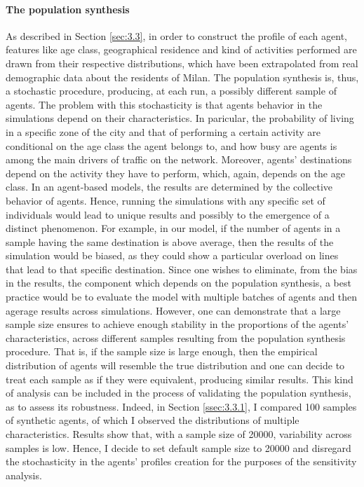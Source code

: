 \paragraph{The population synthesis} 
As described in Section \ref{sec:3.3}, in order to construct the profile of each agent, features like age class, geographical residence and kind of activities performed are drawn from their respective distributions, which have been extrapolated from real demographic data about the residents of Milan. The population synthesis is, thus, a stochastic procedure, producing, at each run, a possibly different sample of agents. The problem with this stochasticity is that agents behavior in the simulations depend on their characteristics. In paricular, the probability of living in a specific zone of the city and that of performing a certain activity are conditional on the age class the agent belongs to, and how busy are agents is among the main drivers of traffic on the network. Moreover, agents' destinations depend on the activity they have to perform, which, again, depends on the age class. In an agent-based models, the results are determined by the collective behavior of agents. Hence, running the simulations with any specific set of individuals would lead to unique results and possibly to the emergence of a distinct phenomenon. For example, in our model, if the number of agents in a sample having the same destination is above average, then the results of the simulation would be biased, as they could show a particular overload on lines that lead to that specific destination. Since one wishes to eliminate, from the bias in the results, the component which depends on the population synthesis, a best practice would be to evaluate the model with multiple batches of agents and then agerage results across simulations. However, one can demonstrate that a large sample size ensures to achieve enough stability in the proportions of the agents' characteristics, across different samples resulting from the population synthesis procedure. That is, if the sample size is large enough, then the empirical distribution of agents will resemble the true distribution and one can decide to treat each sample as if they were equivalent, producing similar results. This kind of analysis can be included in the process of validating the population synthesis, as to assess its robustness. Indeed, in Section \ref{ssec:3.3.1}, I compared 100 samples of synthetic agents, of which I observed the distributions of multiple characteristics. Results show that, with a sample size of 20000, variability across samples is low. Hence, I decide to set default sample size to 20000 and disregard the stochasticity in the agents' profiles creation for the purposes of the sensitivity analysis.

